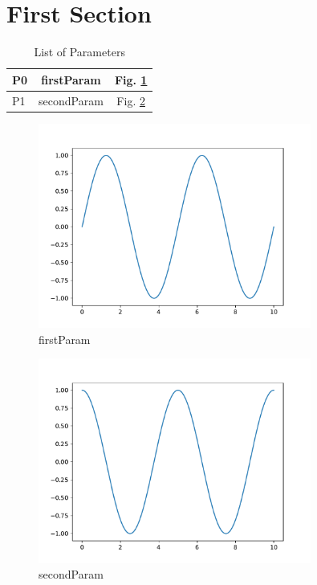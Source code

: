 \documentclass[12pt,a4paper]{article}%
\begin{document}
%
\normalsize%
\section{First Section}%
\label{sec:FirstSection}%


\begin{table}[ht]%
\begin{center}%
\begin{tabular}{|l|c|c|}%
\hline%
P0&firstParam&Fig. \ref{fig:param0}\\%
\hline%
P1&secondParam&Fig. \ref{fig:param1}\\%
\hline%
\end{tabular}%
\caption{List of Parameters}%
\end{center}%
\end{table}

%


\begin{figure}[H]%
\centering%
\includegraphics[width=0.8\textwidth]{./outputs/firstParam.pdf}%
\caption{firstParam}%
\label{fig:param0}%
\end{figure}

%


\begin{figure}[H]%
\centering%
\includegraphics[width=0.8\textwidth]{./outputs/secondParam.pdf}%
\caption{secondParam}%
\label{fig:param1}%
\end{figure}
\end{document}
